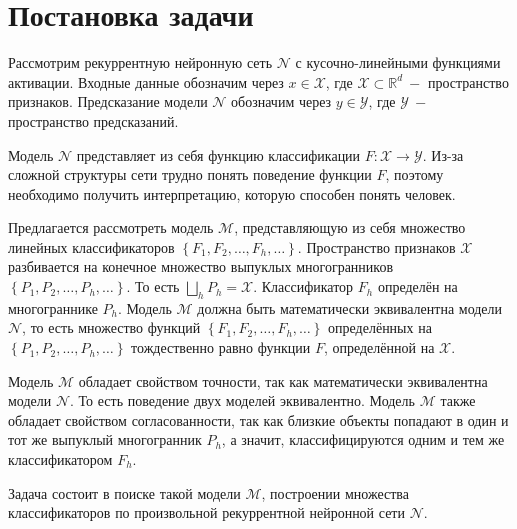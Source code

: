 \documentclass[12pt]{article}
\begin{document}
\section{Постановка задачи}
Рассмотрим рекуррентную нейронную сеть $\mathcal{N}$ с кусочно-линейными функциями активации. Входные данные обозначим через $x \in \mathcal{X}$, где $\mathcal{X} \subset \mathbb{R}^d~-$ пространство признаков. Предсказание модели $\mathcal{N}$ обозначим через $y \in \mathcal{Y}$, где $\mathcal{Y}~-$ пространство предсказаний.

Модель $\mathcal{N}$ представляет из себя функцию классификации $F: \mathcal{X} \to \mathcal{Y}$. Из-за сложной структуры сети трудно понять поведение функции $F$, поэтому необходимо получить интерпретацию, которую способен понять человек.

Предлагается рассмотреть модель $\mathcal{M}$, представляющую из себя множество линейных классификаторов $\left\{F_1, F_2, \dots, F_h, \dots\right\}$. Пространство признаков $\mathcal{X}$ разбивается на конечное множество выпуклых многогранников $\left\{P_1, P_2, \dots, P_h, \dots\right\}$. То есть $\bigsqcup_{h} P_h=\mathcal{X}$. Классификатор $F_h$ определён на многограннике $P_h$. Модель $\mathcal{M}$ должна быть математически эквивалентна модели $\mathcal{N}$, то есть множество функций $\left\{F_1, F_2, \dots, F_h, \dots\right\}$ определённых на $\left\{P_1, P_2, \dots, P_h, \dots\right\}$ тождественно равно функции $F$, определённой на $\mathcal{X}$.

Модель $\mathcal{M}$ обладает свойством точности, так как математически эквивалентна модели $\mathcal{N}$. То есть поведение двух моделей эквивалентно. Модель $\mathcal{M}$ также обладает свойством согласованности, так как близкие объекты попадают в один и тот же выпуклый многогранник $P_h$, а значит, классифицируются одним и тем же классификатором $F_h$.

Задача состоит в поиске такой модели $\mathcal{M}$, построении множества классификаторов по произвольной рекуррентной нейронной сети $\mathcal{N}$.



\end{document}
